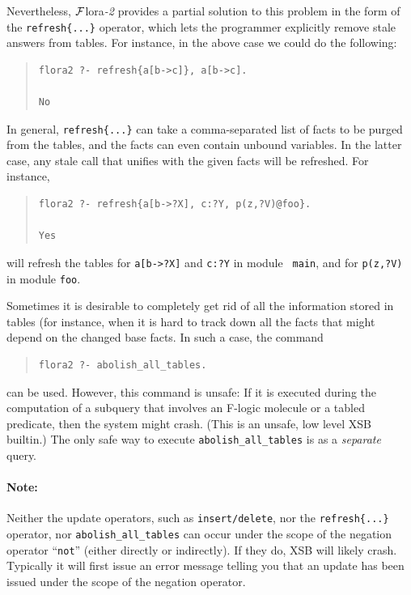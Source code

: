 \documentclass[11pt]{article}
\newcommand{\FLORA}{{\mbox{\sc ${\cal F}${lora}\rm\emph{-2}}}\xspace}
\newcommand{\fl}{\mbox{F-logic}\xspace}
\newcommand{\TNOT}{{{\tt not}}\xspace}
\begin{document}
Nevertheless, \FLORA provides a partial solution to this problem in the form
of the {\tt refresh\{...\}} operator, which lets the programmer explicitly
remove stale answers from tables. For instance, in the above case we could
do the following:
\begin{quote}
\begin{verbatim}
flora2 ?- refresh{a[b->c]}, a[b->c].

No
\end{verbatim}
\end{quote}
In general, {\tt refresh\{...\}} can take a comma-separated list of facts to
be purged from the tables, and the facts can even contain unbound variables.
In the latter case, any stale call that unifies with the given facts will
be refreshed. For instance,
\begin{quote}
\begin{verbatim}
flora2 ?- refresh{a[b->?X], c:?Y, p(z,?V)@foo}.

Yes
\end{verbatim}
\end{quote}
will refresh the tables for {\tt a[b->?X]} and {\tt c:?Y} in module {\tt
  main}, and for {\tt p(z,?V)} in module {\tt foo}.

Sometimes it is desirable to completely get rid of all the information
stored in tables (for instance, when it is hard to track down all the facts
that might depend on the changed base facts. In such a case, the command
\begin{quote}
\begin{verbatim}
flora2 ?- abolish_all_tables.
\end{verbatim}
\end{quote}
can be used. However, this command is unsafe: If it is executed during the
computation of a subquery that involves an \fl molecule or a tabled
predicate, then the system might crash. (This is an unsafe, low level XSB
builtin.)  The only safe way to execute {\tt abolish\_all\_tables} is as a
\emph{separate} query.

\paragraph{Note:} Neither the update operators, such as  {\tt {\tt insert}/delete},
nor the {\tt refresh\{...\}} operator, nor {\tt abolish\_all\_tables}
can occur under the scope of the negation operator ``\TNOT'' (either
directly or indirectly). If they do, XSB will likely crash. Typically it
will first issue an error message telling you that an update has been
issued under the scope of the negation operator.
\end{document}
